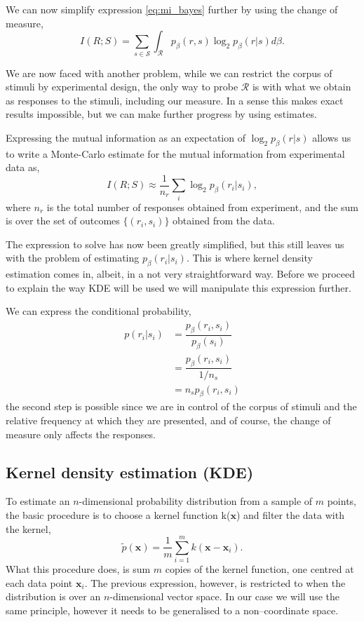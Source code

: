 \documentclass[10pt,a4paper]{book}
\begin{document}
We can now simplify expression \ref{eq:mi_bayes} further by using the change of measure,
\begin{equation}
I(R;S) = \sum_{s \in \mathcal{S}} \int_{\mathcal{R}} p_{\beta}(r,s)\log_2p_{\beta}(r|s)d\beta.
\end{equation}

We are now faced with another problem, while we can restrict the corpus of stimuli by experimental design, the only way to probe $\mathcal{R}$ is with what we obtain as responses to the stimuli, including our measure. In a sense this makes exact results impossible, but we can make further progress by using estimates.

Expressing the mutual information as an expectation of $\log_2p_{\beta}(r|s)$ allows us to write a Monte-Carlo estimate for the mutual information from experimental data as,
\begin{equation}
I(R;S) \approx \dfrac{1}{n_r} \sum_i \log_2 p_{\beta}(r_i|s_i),
\end{equation}
where $n_r$ is the total number of responses obtained from experiment, and the sum is over the set of outcomes $\{ (r_i, s_i) \}$ obtained from the data.

The expression to solve has now been greatly simplified, but this still leaves us with the problem of estimating $p_{\beta} (r_i | s_i)$. This is where kernel density estimation comes in, albeit, in a not very straightforward way. Before we proceed to explain the way KDE will be used we will manipulate this expression further.

We can express the conditional probability,
\begin{align} \label{eq:p_beta_joint}
p(r_i|s_i) & = \dfrac{p_{\beta}(r_i, s_i)}{p_{\beta}(s_i)} \nonumber \\
& = \dfrac{p_{\beta}(r_i, s_i)}{1/n_s} \nonumber \\
& = n_s p_{\beta}(r_i, s_i)
\end{align}
the second step is possible since we are in control of the corpus of stimuli and the relative frequency at which they are presented, and of course, the change of measure only affects the responses.

\subsection{Kernel density estimation (KDE)}

To estimate an $n$-dimensional probability distribution from a sample of $m$ points, the basic procedure is to choose a kernel function k($\mathbf{x}$) and filter the data with the kernel,
\begin{equation}
\tilde{p}(\mathbf{x}) = \dfrac{1}{m}\sum_{i = 1}^{m} k(\mathbf{x} - \mathbf{x}_i).
\end{equation}
What this procedure does, is sum $m$ copies of the kernel function, one centred at each data point $\mathbf{x}_i$. The previous expression, however, is restricted to when the distribution is over an $n$-dimensional vector space. In our case we will use the same principle, however it needs to be generalised to a non--coordinate space.
\end{document}
